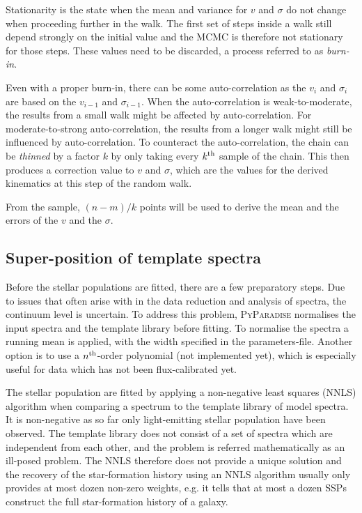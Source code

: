 \documentclass[usenatbib,usegraphicx,useAMS,onecolumn]{mn2e}
\begin{document}
Stationarity is the state when the mean and variance for $v$ and $\sigma$ do not change when proceeding further in the walk.
The first set of steps inside a walk still depend strongly on the initial value and the MCMC is therefore not stationary for those steps.
These values need to be discarded, a process referred to as \textit{burn-in}.

Even with a proper burn-in, there can be some auto-correlation as the $v_i$ and $\sigma_i$ are based on the $v_{i-1}$ and $\sigma_{i-1}$.
When the auto-correlation is weak-to-moderate, the results from a small walk might be affected by auto-correlation.
For moderate-to-strong auto-correlation, the results from a longer walk might still be influenced by auto-correlation.
To counteract the auto-correlation, the chain can be \textit{thinned} by a factor $k$ by only taking every $k^{\rm th}$ sample of the chain.
This then produces a correction value to $v$ and $\sigma$, which are the values for the derived kinematics at this step of the random walk.

From the sample, $(n - m) / k$ points will be used to derive the mean and the errors of the $v$ and the $\sigma$.

\subsection{Super-position of template spectra}\label{subsec:ssp_ssp}
Before the stellar populations are fitted, there are a few preparatory steps.
Due to issues that often arise with in the data reduction and analysis of spectra, the continuum level is uncertain.
To address this problem, \textsc{PyParadise} normalises the input spectra and the template library before fitting.
To normalise the spectra a running mean is applied, with the width specified in the parameters-file.
Another option is to use a $n^{\rm th}$-order polynomial (not implemented yet), which is especially useful for data which has not been flux-calibrated yet.

The stellar population are fitted by applying a non-negative least squares (NNLS) algorithm when comparing a spectrum to the template library of model spectra.
It is non-negative as so far only light-emitting stellar population have been observed.
The template library does not consist of a set of spectra which are independent from each other, and the problem is referred mathematically as an ill-posed problem.
The NNLS therefore does not provide a unique solution and the recovery of the star-formation history using an NNLS algorithm usually only provides at most dozen non-zero weights, e.g. it tells that at most a dozen SSPs construct the full star-formation history of a galaxy.
\end{document}
